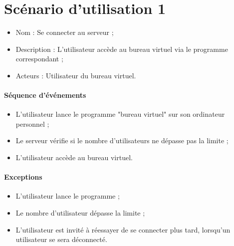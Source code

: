 




\section{Scénario d'utilisation 1}
\begin{itemize}
	\item Nom : Se connecter au serveur ;
	\item Description : L'utilisateur accède au bureau virtuel via le programme correspondant ;
	\item Acteurs : Utilisateur du bureau virtuel.
\end{itemize}

\paragraph{Séquence d'événements}
\begin{itemize}
	\item L'utilisateur lance le programme "bureau virtuel" sur son ordinateur personnel ;
	\item Le serveur vérifie si le nombre d'utilisateurs ne dépasse pas la limite ;
	\item L'utilisateur accède au bureau virtuel.
\end{itemize}

\paragraph{Exceptions}
\begin{itemize}
	\item L'utilisateur lance le programme ;
	\item Le nombre d'utilisateur dépasse la limite ;
	\item L'utilisateur est invité à réessayer de se connecter plus tard, lorsqu'un utilisateur se sera déconnecté.
\end{itemize}

